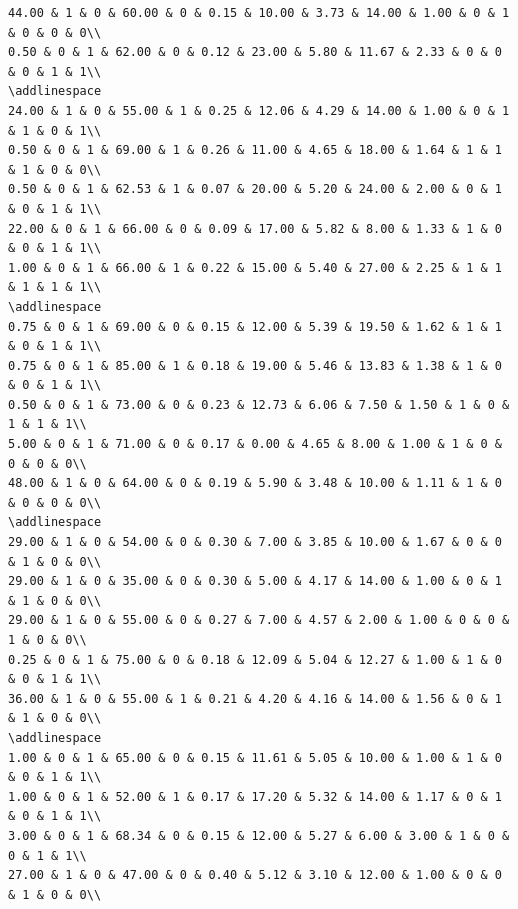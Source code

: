 \documentclass[
]{article}
\begin{document}
\begin{verbatim}
44.00 & 1 & 0 & 60.00 & 0 & 0.15 & 10.00 & 3.73 & 14.00 & 1.00 & 0 & 1 & 0 & 0 & 0\\
0.50 & 0 & 1 & 62.00 & 0 & 0.12 & 23.00 & 5.80 & 11.67 & 2.33 & 0 & 0 & 0 & 1 & 1\\
\addlinespace
24.00 & 1 & 0 & 55.00 & 1 & 0.25 & 12.06 & 4.29 & 14.00 & 1.00 & 0 & 1 & 1 & 0 & 1\\
0.50 & 0 & 1 & 69.00 & 1 & 0.26 & 11.00 & 4.65 & 18.00 & 1.64 & 1 & 1 & 1 & 0 & 0\\
0.50 & 0 & 1 & 62.53 & 1 & 0.07 & 20.00 & 5.20 & 24.00 & 2.00 & 0 & 1 & 0 & 1 & 1\\
22.00 & 0 & 1 & 66.00 & 0 & 0.09 & 17.00 & 5.82 & 8.00 & 1.33 & 1 & 0 & 0 & 1 & 1\\
1.00 & 0 & 1 & 66.00 & 1 & 0.22 & 15.00 & 5.40 & 27.00 & 2.25 & 1 & 1 & 1 & 1 & 1\\
\addlinespace
0.75 & 0 & 1 & 69.00 & 0 & 0.15 & 12.00 & 5.39 & 19.50 & 1.62 & 1 & 1 & 0 & 1 & 1\\
0.75 & 0 & 1 & 85.00 & 1 & 0.18 & 19.00 & 5.46 & 13.83 & 1.38 & 1 & 0 & 0 & 1 & 1\\
0.50 & 0 & 1 & 73.00 & 0 & 0.23 & 12.73 & 6.06 & 7.50 & 1.50 & 1 & 0 & 1 & 1 & 1\\
5.00 & 0 & 1 & 71.00 & 0 & 0.17 & 0.00 & 4.65 & 8.00 & 1.00 & 1 & 0 & 0 & 0 & 0\\
48.00 & 1 & 0 & 64.00 & 0 & 0.19 & 5.90 & 3.48 & 10.00 & 1.11 & 1 & 0 & 0 & 0 & 0\\
\addlinespace
29.00 & 1 & 0 & 54.00 & 0 & 0.30 & 7.00 & 3.85 & 10.00 & 1.67 & 0 & 0 & 1 & 0 & 0\\
29.00 & 1 & 0 & 35.00 & 0 & 0.30 & 5.00 & 4.17 & 14.00 & 1.00 & 0 & 1 & 1 & 0 & 0\\
29.00 & 1 & 0 & 55.00 & 0 & 0.27 & 7.00 & 4.57 & 2.00 & 1.00 & 0 & 0 & 1 & 0 & 0\\
0.25 & 0 & 1 & 75.00 & 0 & 0.18 & 12.09 & 5.04 & 12.27 & 1.00 & 1 & 0 & 0 & 1 & 1\\
36.00 & 1 & 0 & 55.00 & 1 & 0.21 & 4.20 & 4.16 & 14.00 & 1.56 & 0 & 1 & 1 & 0 & 0\\
\addlinespace
1.00 & 0 & 1 & 65.00 & 0 & 0.15 & 11.61 & 5.05 & 10.00 & 1.00 & 1 & 0 & 0 & 1 & 1\\
1.00 & 0 & 1 & 52.00 & 1 & 0.17 & 17.20 & 5.32 & 14.00 & 1.17 & 0 & 1 & 0 & 1 & 1\\
3.00 & 0 & 1 & 68.34 & 0 & 0.15 & 12.00 & 5.27 & 6.00 & 3.00 & 1 & 0 & 0 & 1 & 1\\
27.00 & 1 & 0 & 47.00 & 0 & 0.40 & 5.12 & 3.10 & 12.00 & 1.00 & 0 & 0 & 1 & 0 & 0\\

\end{verbatim}
\end{document}
